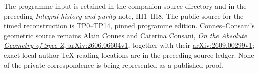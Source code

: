 The programme input is retained in the companion source directory and in
the preceding \emph{Integral history and purity} note, IH1--IH8. The
public source for the timed reconstruction is
\href{https://github.com/KokunoYumeto/zeta-function-research-reader/blob/32acd0df89ae22c96d2bc30372e4426a31ce4506/workbenches/splitzero-tandem/temporary-arguments/20260924-fixed-generic-point-purity/timed-prime-reconstruction/README.md}{TP0--TP14,
pinned programme edition}. Connes--Consani's geometric source remains
Alain Connes and Caterina Consani,
\href{https://arxiv.org/abs/2606.06604v1}{\emph{On the Absolute Geometry
of Spec Z}, arXiv:2606.06604v1}, together with their
\href{https://arxiv.org/abs/2609.00299v1}{arXiv:2609.00299v1}; exact
local author-TeX reading locations are in the preceding source ledger.
None of the private correspondence is being represented as a published
proof.
